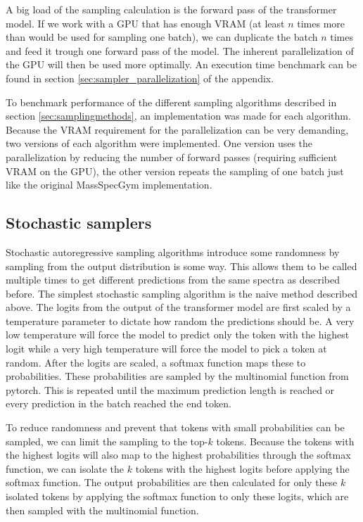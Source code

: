 A big load of the sampling calculation is the forward pass of the transformer model. 
If we work with a GPU that has enough VRAM (at least $n$ times more than would be used for sampling one batch),
we can duplicate the batch $n$ times and feed it trough one forward pass of the model. The inherent parallelization of the GPU will then be used more optimally.
An execution time benchmark can be found in section \ref{sec:sampler_parallelization} of the appendix.

To benchmark performance of the different sampling algorithms described in section \ref{sec:samplingmethods}, an implementation was made for each algorithm.
Because the VRAM requirement for the parallelization can be very demanding, two versions of each algorithm were implemented. 
One version uses the parallelization by reducing the number of forward passes (requiring sufficient VRAM on the GPU), the other version repeats the sampling of one batch just like the original MassSpecGym implementation.

\subsection{Stochastic samplers}

Stochastic autoregressive sampling algorithms introduce some randomness by sampling from the output distribution is some way.
This allows them to be called multiple times to get different predictions from the same spectra as described before.
The simplest stochastic sampling algorithm is the naive method described above.
The logits from the output of the transformer model are first scaled by a temperature parameter to dictate how random the predictions should be.
A very low temperature will force the model to predict only the token with the highest logit while a very high temperature will force the model to pick a token at random.
After the logits are scaled, a softmax function maps these to probabilities. These probabilities are sampled by the multinomial function from pytorch.
This is repeated until the maximum prediction length is reached or every prediction in the batch reached the end token.

To reduce randomness and prevent that tokens with small probabilities can be sampled, we can limit the sampling to the top-$k$ tokens.
Because the tokens with the highest logits will also map to the highest probabilities through the softmax function,
we can isolate the $k$ tokens with the highest logits before applying the softmax function.
The output probabilities are then calculated for only these $k$ isolated tokens by applying the softmax function to only these logits, which are then sampled with the multinomial function.

